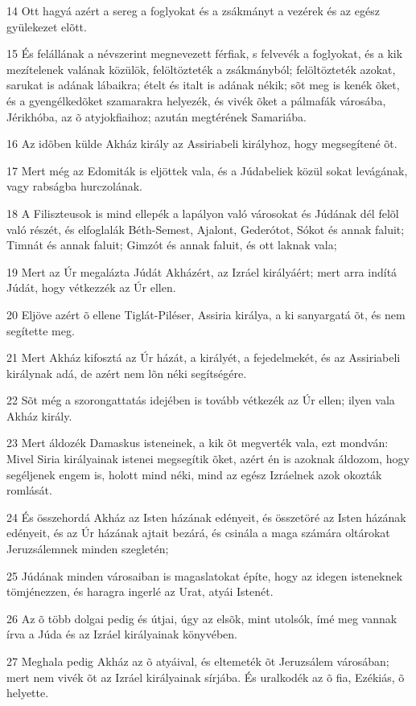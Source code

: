 \par 14 Ott hagyá azért a sereg a foglyokat és a zsákmányt a vezérek és az egész gyülekezet elõtt.
\par 15 És felállának a névszerint megnevezett férfiak, s felvevék a foglyokat, és a kik mezítelenek valának közülök, felöltözteték a zsákmányból; felöltözteték azokat, sarukat is adának lábaikra; ételt és italt is adának nékik; sõt meg is kenék õket, és a gyengélkedõket szamarakra helyezék, és vivék õket a pálmafák városába, Jérikhóba, az õ atyjokfiaihoz; azután megtérének Samariába.
\par 16 Az idõben külde Akház király az Assiriabeli királyhoz, hogy megsegítené õt.
\par 17 Mert még az Edomiták is eljöttek vala, és a Júdabeliek közül sokat levágának, vagy rabságba hurczolának.
\par 18 A Filiszteusok is mind ellepék a lapályon való városokat és Júdának dél felõl való részét, és elfoglalák Béth-Semest, Ajalont, Gederótot, Sókot és annak faluit; Timnát és annak faluit; Gimzót és annak faluit, és ott laknak vala;
\par 19 Mert az Úr megalázta Júdát Akházért, az Izráel királyáért; mert arra indítá Júdát, hogy vétkezzék az Úr ellen.
\par 20 Eljöve azért õ ellene Tiglát-Piléser, Assiria királya, a ki sanyargatá õt, és nem segítette meg.
\par 21 Mert Akház kifosztá az Úr házát, a királyét, a fejedelmekét, és az Assiriabeli királynak adá, de azért nem lõn néki segítségére.
\par 22 Sõt még a szorongattatás idejében is tovább vétkezék az Úr ellen; ilyen vala Akház király.
\par 23 Mert áldozék Damaskus isteneinek, a kik õt megverték vala, ezt mondván: Mivel Siria királyainak istenei megsegítik õket, azért én is azoknak áldozom, hogy segéljenek engem is, holott mind néki, mind az egész Izráelnek azok okozták romlását.
\par 24 És összehordá Akház az Isten házának edényeit, és összetöré az Isten házának edényeit, és az Úr házának ajtait bezárá, és csinála a maga számára oltárokat Jeruzsálemnek minden szegletén;
\par 25 Júdának minden városaiban is magaslatokat építe, hogy az idegen isteneknek tömjénezzen, és haragra ingerlé az Urat, atyái Istenét.
\par 26 Az õ több dolgai pedig és útjai, úgy az elsõk, mint utolsók, ímé meg vannak írva a Júda és az Izráel királyainak könyvében.
\par 27 Meghala pedig Akház az õ atyáival, és eltemeték õt Jeruzsálem városában; mert nem vivék õt az Izráel királyainak sírjába. És uralkodék az õ fia, Ezékiás, õ helyette.

